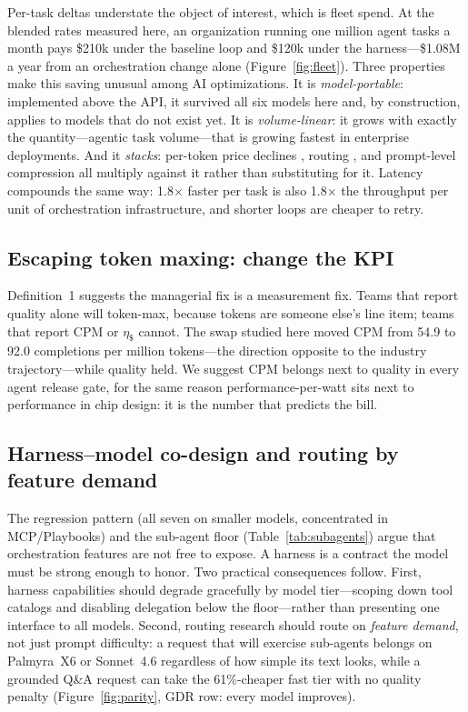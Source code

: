 \documentclass[11pt]{article}
\newcommand{\SpeedX}{1.8$\times$}
\newcommand{\CPMA}{54.9}\newcommand{\CPMB}{92.0}\newcommand{\CPMgain}{68\%}
\begin{document}
Per-task deltas understate the object of interest, which is fleet spend. At the blended rates measured here, an organization running one million agent tasks a month pays \$210k under the baseline loop and \$120k under the harness---\$1.08M a year from an orchestration change alone (Figure~\ref{fig:fleet}). Three properties make this saving unusual among AI optimizations. It is \emph{model-portable}: implemented above the API, it survived all six models here and, by construction, applies to models that do not exist yet. It is \emph{volume-linear}: it grows with exactly the quantity---agentic task volume---that is growing fastest in enterprise deployments. And it \emph{stacks}: per-token price declines \cite{epoch2025}, routing \cite{frugalgpt,routellm}, and prompt-level compression \cite{llmlingua,cod} all multiply against it rather than substituting for it. Latency compounds the same way: \SpeedX{} faster per task is also \SpeedX{} the throughput per unit of orchestration infrastructure, and shorter loops are cheaper to retry.

\subsection{Escaping token maxing: change the KPI}
\label{sec:kpi}

Definition~1 suggests the managerial fix is a measurement fix. Teams that report quality alone will token-max, because tokens are someone else's line item; teams that report $\mathrm{CPM}$ or $\eta_{\$}$ cannot. The swap studied here moved $\mathrm{CPM}$ from \CPMA{} to \CPMB{} completions per million tokens---the direction opposite to the industry trajectory---while quality held. We suggest CPM belongs next to quality in every agent release gate, for the same reason performance-per-watt sits next to performance in chip design: it is the number that predicts the bill.

\subsection{Harness--model co-design and routing by feature demand}
\label{sec:codesign}

The regression pattern (all seven on smaller models, concentrated in MCP/Playbooks) and the sub-agent floor (Table~\ref{tab:subagents}) argue that orchestration features are not free to expose. A harness is a contract the model must be strong enough to honor. Two practical consequences follow. First, harness capabilities should degrade gracefully by model tier---scoping down tool catalogs and disabling delegation below the floor---rather than presenting one interface to all models. Second, routing research \cite{frugalgpt,routellm} should route on \emph{feature demand}, not just prompt difficulty: a request that will exercise sub-agents belongs on Palmyra~X6 or Sonnet~4.6 regardless of how simple its text looks, while a grounded Q\&A request can take the 61\%-cheaper fast tier with no quality penalty (Figure~\ref{fig:parity}, GDR row: every model improves).
\end{document}
